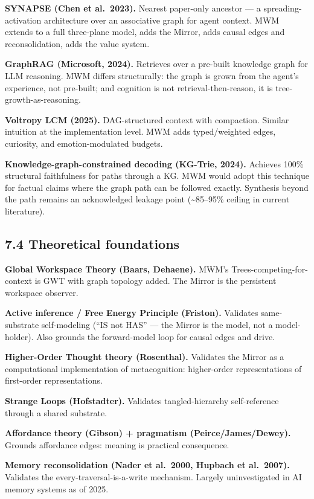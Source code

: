 \documentclass[12pt]{article}
\begin{document}
\textbf{SYNAPSE (Chen et al.~2023).} Nearest paper-only ancestor --- a spreading-activation architecture over an associative graph for agent context. MWM extends to a full three-plane model, adds the Mirror, adds causal edges and reconsolidation, adds the value system.

\textbf{GraphRAG (Microsoft, 2024).} Retrieves over a pre-built knowledge graph for LLM reasoning. MWM differs structurally: the graph is grown from the agent's experience, not pre-built; and cognition is not retrieval-then-reason, it is tree-growth-as-reasoning.

\textbf{Voltropy LCM (2025).} DAG-structured context with compaction. Similar intuition at the implementation level. MWM adds typed/weighted edges, curiosity, and emotion-modulated budgets.

\textbf{Knowledge-graph-constrained decoding (KG-Trie, 2024).} Achieves 100\% structural faithfulness for paths through a KG. MWM would adopt this technique for factual claims where the graph path can be followed exactly. Synthesis beyond the path remains an acknowledged leakage point (\textasciitilde85--95\% ceiling in current literature).

\subsection{7.4 Theoretical foundations}\label{theoretical-foundations}

\textbf{Global Workspace Theory (Baars, Dehaene).} MWM's Trees-competing-for-context is GWT with graph topology added. The Mirror is the persistent workspace observer.

\textbf{Active inference / Free Energy Principle (Friston).} Validates same-substrate self-modeling (``IS not HAS'' --- the Mirror is the model, not a model-holder). Also grounds the forward-model loop for causal edges and drive.

\textbf{Higher-Order Thought theory (Rosenthal).} Validates the Mirror as a computational implementation of metacognition: higher-order representations of first-order representations.

\textbf{Strange Loops (Hofstadter).} Validates tangled-hierarchy self-reference through a shared substrate.

\textbf{Affordance theory (Gibson) + pragmatism (Peirce/James/Dewey).} Grounds affordance edges: meaning is practical consequence.

\textbf{Memory reconsolidation (Nader et al.~2000, Hupbach et al.~2007).} Validates the every-traversal-is-a-write mechanism. Largely uninvestigated in AI memory systems as of 2025.
\end{document}
